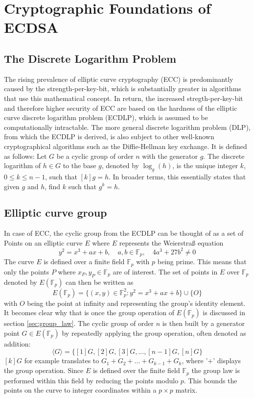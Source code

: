 \section{Cryptographic Foundations of ECDSA}
\subsection{The Discrete Logarithm Problem}\label{sec:dlp}
The rising prevalence of elliptic curve cryptography (ECC) is predominantly caused by the strength-per-key-bit, which is substantially greater in algorithms that use this mathematical concept. In return, the increased stregth-per-key-bit and therefore higher security of ECC are based on the hardness of the elliptic curve discrete logarithm problem (ECDLP), which is assumed to be computationally intractable. The more general discrete logarithm problem (DLP), from which the ECDLP is derived, is also subject to other well-known cryptographical algorithms such as the Diffie-Hellman key exchange. It is defined as follows: Let $G$ be a cyclic group of order $n$ with the generator $g$. The discrete logarithm of $h \in G$ to the base $g$, denoted by $\log_g(h)$, is the unique integer $k$, $0 \leq k \leq n-1$, such that $[k]g = h$\cite{bsi_ecdsa}. In broader terms, this essentially states that given $g$ and $h$, find $k$ such that $g^k = h$.

\subsection{Elliptic curve group}\label{sec:ec_group}
In case of ECC, the cyclic group from the ECDLP can be thought of as a set of Points on an elliptic curve $E$ where $E$ represents the Weierstraß equation
$$y^2=x^3+ax+b, \quad a, b \in \mathbb{F}_p, \quad 4a^3 + 27b^2\ne0$$
The curve $E$ is defined over a finite field $\mathbb{F}_p$ with $p$ being prime. This means that only the points $P$ where $x_P, y_P \in \mathbb{F}_p$ are of interest.\newline
The set of points in $E$ over $\mathbb{F}_p$ denoted by $E(\mathbb{F}_p)$ can then be written as 
$$E(\mathbb{F}_p) = \{ (x, y) \in \mathbb{F}_p^2 : y^2 = x^3 + ax + b\} \cup \{O\}$$ 
with $O$ being the point at infinity and representing the group's identity element. It becomes clear why that is once the group operation of $E(\mathbb{F}_p)$ is discussed in section \ref{sec:group_law}. \newline
The cyclic group of order $n$ is then built by a generator point $G \in E(\mathbb{F}_p)$ by repeatedly applying the group operation, often denoted as addition:
$$\langle G \rangle = \{[1]G, [2]G, [3]G, ..., [n-1]G, [n]G\}$$ 
$[k]G$ for example translates to $G_1+G_2+...+G_{k-1}+G_k$, where '$+$' displays the group operation. Since $E$ is defined over the finite field $\mathbb{F}_p$ the group law is performed within this field by reducing the points modulo $p$. This bounds the points on the curve to integer coordinates within a $p \times p$ matrix\cite{bsi_ecdsa}.

